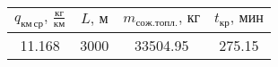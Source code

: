 \begin{tabular}{|c|c|c|c|}
\hline
$q_{км\, ср},\, \frac{кг}{км}$ & $L,\, м$ & $m_{сож. топл.},\, кг$ & $t_{кр},\, мин$ \\ 
\hline
11.168 & 3000 & 33504.95 & 275.15 \\ 
\hline
\end{tabular}